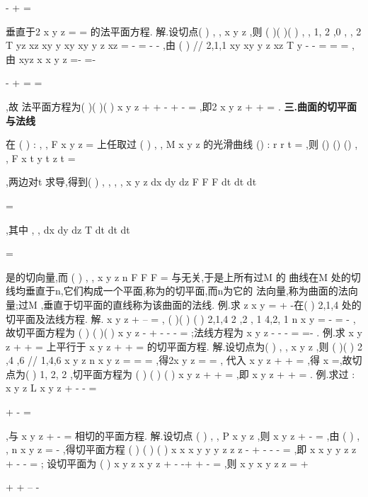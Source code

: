 \Gamma -
+
=

垂直于2
x
y
z
=
=
的法平面方程. 
解.设切点(
)
, ,
x y z ,则
(
)(
)(
)
,
,
1, 2 ,0
,
, 2
T
yz xz xy
y
xy
xy
y z
xz
=
\times 
-
=
-
-
\rho 
,由 
(
)
// 2,1,1
xy
xy
y z
xz
T
y
-
-
\Rightarrow 
=
=
\Rightarrow 
=
\rho 
,由
xyz
x
x
y
z
=-
=-


\Rightarrow 


-
+
=
=


,故 
法平面方程为(
)(
)(
)
x
y
z
+
+
-
+
-
=
,即2
x
y
z
+
+
=
. 
\vspace{4pt}
{\bfseries \textcolor{lyred}{三.曲面的切平面与法线}}

在
(
)
:
, ,
F x y z
\Sigma 
=
上任取过
(
)
, ,
M x y z 的光滑曲线
()
: r
r t
\Gamma 
=
\rho 
\rho 
,则 
()
()
()
,
,
F x t
y t
z t
=




,两边对t 求导,得到(
)
,
,
,
,
x
y
z
dx dy dz
F F F
dt
dt
dt


\cdots 
=




,其中 
,
,
dx dy dz
T
dt
dt
dt


=



\xi \rho 
是\Gamma 的切向量,而
(
)
,
,
x
y
z
n
F F F
=
\rho 
与\Gamma 无关,于是\Sigma 上所有过M 的 
曲线在M 处的切线均垂直于n\rho ,它们构成一个平面,称为\Sigma 的\textcolor{lyred}{切平面},而n\rho 为它的 
法向量,称为曲面\Sigma 的\textcolor{lyred}{法向量};过M ,垂直于切平面的直线称为该曲面的\textcolor{lyred}{法线}. 
\textcolor{lyred}{例}.求
z
x
y
=
+
-在(
)
2,1,4 处的切平面及法线方程. 
解.
x
y
z
+
--
=
,
(
)(
)
(
)
2,1,4
2 ,2 , 1
4,2, 1
n
x
y
=
-
=
-
\rho 
,故切平面方程为 
(
)
(
)(
)
x
y
z
-
+
-
-
-
=
;法线方程为
x
y
z
-
-
-
=
=-
. 
\textcolor{lyred}{例}.求
x
y
z
+
+
=
上平行于
x
y
z
+
+
=
的切平面方程. 
解.设切点为(
)
, ,
x y z ,则
(
)(
)
2 ,4 ,6
// 1,4,6
x
y
z
n
x
y
z
=
\Rightarrow 
=
=
\rho 
,得2x
y
z
=
=
, 
代入
x
y
z
+
+
=
,得
x =\pm ,故切点为(
)
1, 2, 2
\pm \pm 
\pm 
,切平面方程为
(
)
(
)
(
)
x
y
z
\pm 
+\cdots 
\pm 
+\cdots 
\pm 
=
,即
x
y
z
+
+
=\pm 
. 
\textcolor{lyred}{例}.求过
:
x
y
z
L
x
y
z
+
-
-
=

+
-
=

,与
x
y
z
+
-
=
相切的平面方程. 
解.设切点
(
)
,
,
P x
y z
,则
x
y
z
+
-
=
,由
(
)
,
,
n
x
y
z
=
-
\rho 
,得切平面方程 
(
)
(
)
(
)
x
x
x
y
y
y
z
z
z
-
+
-
-
-
=
,即
x x
y y
z z
+
-
-
=
; 
设切平面为
(
)
x
y
z
x
y
z
\lambda 
+
-
-+
+
-
=
,则 
x
y
x
y
z
z
\lambda 
\lambda 
\lambda 
\lambda 
\lambda 
\lambda 
=
+

+
+
--
-

